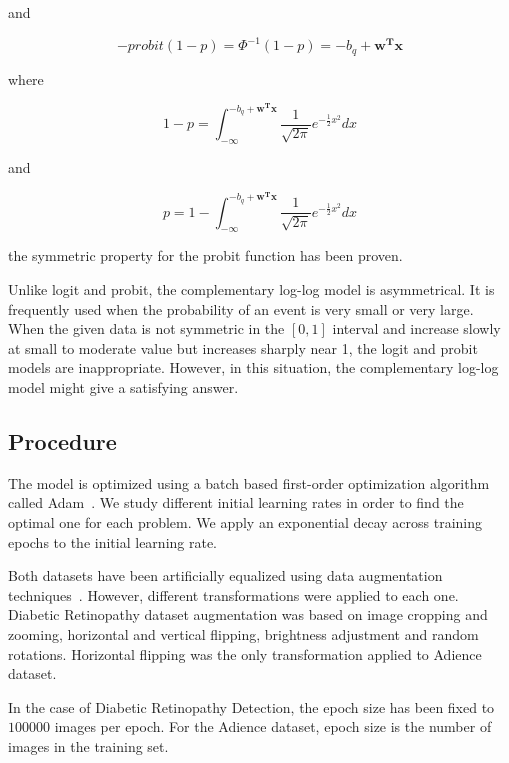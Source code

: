 \documentclass[journal]{IEEEtran}
\begin{document}
\begin{enumerate}
		and
		
		\begin{equation}
		-probit(1-p) = \Phi^{-1}(1-p) = -b_q + \mathbf{w^Tx}
		\end{equation}
		
		where
		
		\begin{equation}
		1 - p = \int_{-\infty}^{-b_q + \mathbf{w^Tx}} \frac{1}{\sqrt{2\pi}} e^{-\frac{1}{2}x^2} dx
		\end{equation}
		
		and
		
		\begin{equation}
		p = 1 - \int_{-\infty}^{-b_q + \mathbf{w^Tx}} \frac{1}{\sqrt{2\pi}} e^{-\frac{1}{2}x^2} dx
		\end{equation}

		the symmetric property for the probit function has been proven.
	\end{enumerate}
	
	
	Unlike logit and probit, the complementary log-log model is asymmetrical. It is frequently used when the probability of an event is very small or very large. When the given data is not symmetric in the $[0,1]$ interval and increase slowly at small to moderate value but increases sharply near 1, the logit and probit models are inappropriate. However, in this situation, the complementary log-log model might give a satisfying answer.
	
	\subsection{Procedure}
	\label{sect:procedure}
	The model is optimized using a batch based first-order optimization algorithm called Adam~\cite{kingma2014adam}. We study different initial learning rates in order to find the optimal one for each problem. We apply an exponential decay across training epochs to the initial learning rate.
	
	Both datasets have been artificially equalized using data augmentation techniques~\cite{van2001art,krizhevsky2012imagenet}. However, different transformations were applied to each one. Diabetic Retinopathy dataset augmentation was based on image cropping and zooming, horizontal and vertical flipping, brightness adjustment and random rotations. Horizontal flipping was the only transformation applied to Adience dataset.
	
	In the case of Diabetic Retinopathy Detection, the epoch size has been fixed to $100000$ images per epoch. For the Adience dataset, epoch size is the number of images in the training set.
	
\end{document}
